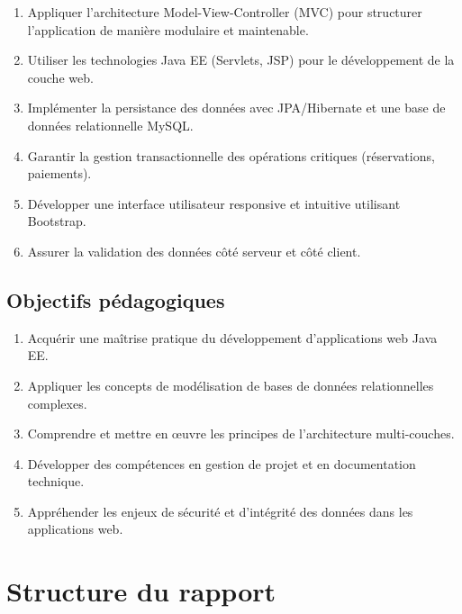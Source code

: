 \documentclass[12pt,a4paper]{report}
\begin{document}
\begin{enumerate}
    \item Appliquer l'architecture Model-View-Controller (MVC) pour structurer l'application de manière modulaire et maintenable.
    
    \item Utiliser les technologies Java EE (Servlets, JSP) pour le développement de la couche web.
    
    \item Implémenter la persistance des données avec JPA/Hibernate et une base de données relationnelle MySQL.
    
    \item Garantir la gestion transactionnelle des opérations critiques (réservations, paiements).
    
    \item Développer une interface utilisateur responsive et intuitive utilisant Bootstrap.
    
    \item Assurer la validation des données côté serveur et côté client.
\end{enumerate}

\subsection*{Objectifs pédagogiques}

\begin{enumerate}
    \item Acquérir une maîtrise pratique du développement d'applications web Java EE.
    
    \item Appliquer les concepts de modélisation de bases de données relationnelles complexes.
    
    \item Comprendre et mettre en œuvre les principes de l'architecture multi-couches.
    
    \item Développer des compétences en gestion de projet et en documentation technique.
    
    \item Appréhender les enjeux de sécurité et d'intégrité des données dans les applications web.
\end{enumerate}

\section*{Structure du rapport}
\end{document}

